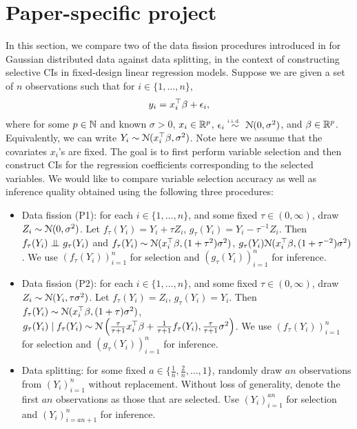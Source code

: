 \section{Paper-specific project}\label{sec:project}
In this section, we compare two of the data fission procedures introduced in \cite{leiner2022data} for Gaussian distributed data against data splitting, in the context of constructing selective CIs in fixed-design linear regression models. Suppose we are given a set of $n$ observations such that for $i\in\{1,\dots,n\}$, 
\[
y_i = x_i^\top \beta + \epsilon_i,
\]
where for some $p\in\mathbb{N}$ and known $\sigma>0$, $x_i\in\mathbb{R}^p$, $\epsilon_i\overset{\textrm{\tiny i.i.d.\ }}{\sim} \mathcal{N}(0,\sigma^2)$, and $\beta\in\mathbb{R}^p$. Equivalently, we can write $Y_i\sim\mathcal{N}(x_i^\top\beta, \sigma^2)$. Note here we assume that the covariates $x_i$'s are fixed. The goal is to first perform variable selection and then construct CIs for the regression coefficients corresponding to the selected variables. We would like to compare variable selection accuracy as well as inference quality obtained using the following three procedures:
\begin{itemize}
\item Data fission (P1): for each $i\in\{1,\dots,n\}$, and some fixed $\tau\in(0,\infty)$, draw $Z_i\sim\mathcal{N}(0,\sigma^2)$. Let $f_\tau(Y_i) = Y_i + \tau Z_i$, $g_\tau(Y_i) = Y_i - \tau^{-1}Z_i$. Then $f_\tau(Y_i)\indep g_\tau(Y_i)$ and $f_\tau(Y_i)\sim\mathcal{N}(x_i^\top\beta, (1+\tau^2)\sigma^2)$, $g_\tau(Y_i)\mathcal{N}(x_i^\top\beta, (1+\tau^{-2})\sigma^2)$. We use $(f_\tau(Y_i))_{i=1}^n$ for selection and $(g_\tau(Y_i))_{i=1}^n$ for inference.
\item Data fission (P2): for each $i\in\{1,\dots,n\}$, and some fixed $\tau\in(0,\infty)$, draw $Z_i\sim\mathcal{N}(Y_i,\tau\sigma^2)$. Let $f_\tau(Y_i) = Z_i$, $g_\tau(Y_i) = Y_i$. Then $f_\tau(Y_i)\sim\mathcal{N}(x_i^\top\beta, (1+\tau)\sigma^2)$, $g_\tau(Y_i)\mid f_\tau(Y_i)\sim\mathcal{N}\left(\frac{\tau}{\tau+1}x_i^\top\beta + \frac{1}{\tau+1}f_\tau(Y_i), \frac{\tau}{\tau+1}\sigma^2\right)$. We use $(f_\tau(Y_i))_{i=1}^n$ for selection and $(g_\tau(Y_i))_{i=1}^n$ for inference.
\item Data splitting: for some fixed $a\in\{\frac{1}{n}, \frac{2}{n}, \dots, 1\}$, randomly draw $an$ observations from $(Y_i)_{i=1}^n$ without replacement. Without loss of generality, denote the first $an$ observations as those that are selected. Use $(Y_i)_{i=1}^{an}$ for selection and $(Y_i)_{i=an+1}^n$ for inference.
\end{itemize}
